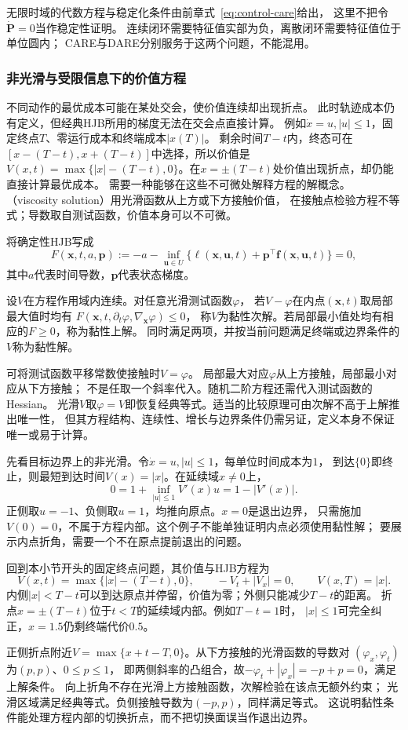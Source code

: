 无限时域的代数方程与稳定化条件由前章式~\eqref{eq:control-care}给出，
这里不把令$\dot{\bm P}=0$当作稳定性证明。
连续闭环需要特征值实部为负，离散闭环需要特征值位于单位圆内；
CARE与DARE分别服务于这两个问题，不能混用。

\subsubsection{非光滑与受限信息下的价值方程}

不同动作的最优成本可能在某处交会，使价值连续却出现折点。
此时轨迹成本仍有定义，但经典HJB所用的梯度无法在交会点直接计算。
例如$\dot x=u,|u|\leq1$，固定终点$T$、零运行成本和终端成本$|x(T)|$。
剩余时间$T-t$内，终态可在$[x-(T-t),x+(T-t)]$中选择，所以价值是
$V(x,t)=\max\{|x|-(T-t),0\}$。在$x=\pm(T-t)$处价值出现折点，却仍能直接计算最优成本。
需要一种能够在这些不可微处解释方程的解概念。
（viscosity solution）用光滑函数从上方或下方接触价值，
在接触点检验方程不等式；导数取自测试函数，价值本身可以不可微。

将确定性HJB写成
\[
  F(\bm x,t,a,\bm p)
  :=-a-\inf_{\bm u\in U}
      \{\ell(\bm x,\bm u,t)+\bm p^\top\bm f(\bm x,\bm u,t)\}=0,
\]
其中$a$代表时间导数，$\bm p$代表状态梯度。
\begin{definition}[连续价值函数的黏性解]
\label{def:control-viscosity-solution}
设$V$在方程作用域内连续。对任意光滑测试函数$\varphi$，
若$V-\varphi$在内点$(\bm x,t)$取局部最大值时均有
$F(\bm x,t,\partial_t\varphi,\nabla_{\bm x}\varphi)\leq0$，
称$V$为黏性次解。若局部最小值处均有相应的$F\geq0$，称为黏性上解。
同时满足两项，并按当前问题满足终端或边界条件的$V$称为黏性解。
\end{definition}
可将测试函数平移常数使接触时$V=\varphi$。
局部最大对应$\varphi$从上方接触，局部最小对应从下方接触；
不是任取一个斜率代入。随机二阶方程还需代入测试函数的Hessian。
光滑$V$取$\varphi=V$即恢复经典等式。适当的比较原理可由次解不高于上解推出唯一性，
但其方程结构、连续性、增长与边界条件仍需另证，定义本身不保证唯一或易于计算。

先看目标边界上的非光滑。令$\dot x=u,|u|\leq1$，每单位时间成本为$1$，
到达$\{0\}$即终止，则最短到达时间$V(x)=|x|$。在延续域$x\neq0$上，
\[
  0=1+\inf_{|u|\leq1}V'(x)u=1-|V'(x)|.
\]
正侧取$u=-1$、负侧取$u=1$，均推向原点。$x=0$是退出边界，
只需施加$V(0)=0$，不属于方程内部。这个例子不能单独证明内点必须使用黏性解；
要展示内点折角，需要一个不在原点提前退出的问题。

\begin{example}[延续域内部的价值折点]
\label{ex:control-viscosity-interior-kink}
回到本小节开头的固定终点问题，其价值与HJB方程为
\[
  V(x,t)=\max\{|x|-(T-t),0\},\qquad
  -V_t+|V_x|=0,\qquad V(x,T)=|x|.
\]
内侧$|x|<T-t$可以到达原点并停留，价值为零；外侧只能减少$T-t$的距离。
折点$x=\pm(T-t)$位于$t<T$的延续域内部。例如$T-t=1$时，
$|x|\leq1$可完全纠正，$x=1.5$仍剩终端代价$0.5$。

正侧折点附近$V=\max\{x+t-T,0\}$。从下方接触的光滑函数的导数对
$(\varphi_x,\varphi_t)$为$(p,p)$、$0\leq p\leq1$，
即两侧斜率的凸组合，故$-\varphi_t+|\varphi_x|=-p+p=0$，满足上解条件。
向上折角不存在光滑上方接触函数，次解检验在该点无额外约束；
光滑区域满足经典等式。负侧接触导数为$(-p,p)$，同样满足等式。
这说明黏性条件能处理方程内部的切换折点，而不把切换面误当作退出边界。
\end{example}

